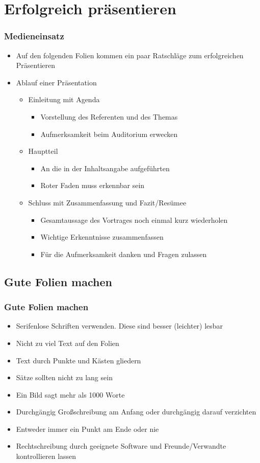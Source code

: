 \documentclass{beamer}
\begin{document}
\section{Erfolgreich präsentieren}
\begin{frame}
\frametitle{Medieneinsatz}
\begin{itemize}
\item Auf den folgenden Folien kommen ein paar Ratschläge zum erfolgreichen Präsentieren
\item Ablauf einer Präsentation
\begin{itemize}
\item Einleitung mit Agenda
\begin{itemize}
\item Vorstellung des Referenten und des Themas
\item Aufmerksamkeit beim Auditorium erwecken
\end{itemize}
\item Hauptteil
\begin{itemize}
\item An die in der Inhaltsangabe aufgeführten
\item Roter Faden muss erkennbar sein
\end{itemize}
\item Schluss mit Zusammenfassung und Fazit/Resümee
\begin{itemize}
\item Gesamtaussage des Vortrages noch einmal kurz wiederholen
\item Wichtige Erkenntnisse zusammenfassen
\item Für die Aufmerksamkeit danken und Fragen zulassen
\end{itemize}
\end{itemize}
\end{itemize}
\end{frame}


\subsection{Gute Folien machen}
\begin{frame}
\frametitle{Gute Folien machen}
\begin{itemize}
\item Serifenlose Schriften verwenden. Diese sind besser (leichter) lesbar
\item Nicht zu viel Text auf den Folien
\item Text durch Punkte und Kästen gliedern
\item Sätze sollten nicht zu lang sein
\item Ein Bild sagt mehr als 1000 Worte
\item Durchgängig Großschreibung am Anfang oder durchgängig darauf verzichten
\item Entweder immer ein Punkt am Ende oder nie
\item Rechtschreibung durch geeignete Software und Freunde/Verwandte kontrollieren lassen
\end{itemize}
\end{frame}
\end{document}
